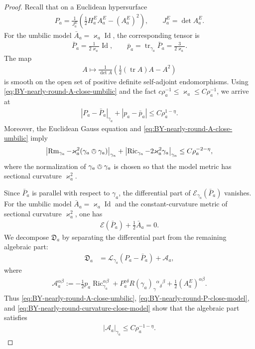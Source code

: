 \documentclass[10pt,a4paper]{amsart}
\newcommand{\tr}{\operatorname{tr}}
\newcommand{\Ric}{\operatorname{Ric}}
\newcommand{\Rm}{\operatorname{Rm}}
\newcommand{\Id}{\operatorname{Id}}
\begin{document}
\begin{proof}
		Recall that on a Euclidean hypersurface
		\begin{align*}
			P_a
			=
			\frac{1}{J_a^E}
			\left(
			\frac12 H_a^E A_a^E-(A_a^E)^2
			\right),
			\qquad
			J_a^E=\det A_a^E .
		\end{align*}
		For the umbilic model $\bar A_a=\varkappa_a\Id$, the
		corresponding tensor is
		\begin{align*}
			\bar P_a=\frac{1}{2\varkappa_a}\operatorname{Id},
			\qquad
			\bar p_a=\tr_{\gamma_a}\bar P_a
			=
			\frac{3}{2\varkappa_a}.
		\end{align*}
		The map
		\begin{align*}
			A\longmapsto
			\frac{1}{\det A}
			\left(
			\frac12(\operatorname{tr}A)A-A^2
			\right)
		\end{align*}
		is smooth on the open set of positive definite self-adjoint endomorphisms. Using
		\eqref{eq:BY-nearly-round-A-close-umbilic} and the fact $c\rho_a^{-1}\leq \varkappa_a\leq C\rho_a^{-1}$, we arrive at
		\begin{align}
			\label{eq:BY-nearly-round-P-close-model}
			|P_a-\bar P_a|_{\gamma_a}
			+
			|p_a-\bar p_a|
			\leq
			C\rho_a^{1-\eta}.
		\end{align}
		Moreover, the Euclidean Gauss equation and
		\eqref{eq:BY-nearly-round-A-close-umbilic} imply
		\begin{align}
			\label{eq:BY-nearly-round-curvature-close-model}
			\left|
			\Rm_{\gamma_a}
			-
			\varkappa_a^2(\gamma_a\owedge\gamma_a)
			\right|_{\gamma_a}
			+
			\left|
			\Ric_{\gamma_a}
			-
			2\varkappa_a^2\gamma_a
			\right|_{\gamma_a}
			\leq
			C\rho_a^{-2-\eta},
		\end{align}
		where the normalization of $\gamma_a\owedge\gamma_a$ is chosen so that
		the model metric has sectional curvature $\varkappa_a^2$.
		
		Since $\bar P_a$ is parallel with respect to $\gamma_a$, the differential
		part of $\mathcal E_{\gamma_a}(\bar P_a)$ vanishes. For the umbilic model
		$\bar A_a=\varkappa_a\Id$ and the constant-curvature metric of sectional
		curvature $\varkappa_a^2$, one has
		\begin{align*}
			\mathcal E(\bar P_a)+\frac12\bar A_a=0.
		\end{align*}
		We decompose $\mathfrak D_a$ by separating the differential part from the
		remaining algebraic part:
		\begin{align*}
			\mathfrak D_a
			&=
			\mathcal L_{\gamma_a}(P_a-\bar P_a)
			+
			\mathcal A_a,
		\end{align*}
		where
		\begin{align*}
			\mathcal A_a^{\alpha\beta}
			:=
			-\frac12 p_a\Ric_{\gamma_a}^{\alpha\beta}
			+
			P_a^{\gamma\delta}
			R(\gamma_a)_{\gamma}{}^{\alpha}{}_{\delta}{}^{\beta}
			+
			\frac12(A_a^E)^{\alpha\beta}.
		\end{align*}
		Thus \eqref{eq:BY-nearly-round-A-close-umbilic},
		\eqref{eq:BY-nearly-round-P-close-model}, and
		\eqref{eq:BY-nearly-round-curvature-close-model} show that the algebraic
		part satisfies
		\begin{align*}
			|\mathcal A_a|_{\gamma_a}
			\leq
			C\rho_a^{-1-\eta}.
		\end{align*}
		

\end{proof}
\end{document}
